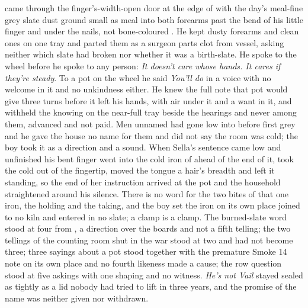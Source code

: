  came through the finger's-width-open door at the edge of  with the day's meal-fine grey slate dust ground small as meal into both forearms past the bend of his little finger and under the nails, not bone-coloured . He kept dusty forearms and clean ones on one tray and parted them as a surgeon parts clot from vessel, asking neither which slate had broken nor whether it was a birth-slate. He spoke to the wheel before he spoke to any person: \emph{It doesn't care whose hands. It cares if they're steady}. To a pot on the wheel he said \emph{You'll do} in a voice with no welcome in it and no unkindness either. He knew the full note that pot would give three turns before it left his hands, with air under it and a want in it, and withheld the knowing on the near-full tray beside the hearings and never among them, advanced and not paid. Men unnamed had gone low into  before first grey and he gave the house no name for them and did not say the room was cold; the boy took it as a direction and a sound. When Sella's sentence came low and unfinished his bent finger went into the cold iron of  ahead of the end of it, took the cold out of the fingertip, moved the tongue a hair's breadth and left it standing, so the end of her instruction arrived at the pot and the household straightened around his silence. There is no  word for the two bites of that one iron, the holding and the taking, and the boy set the iron on its own place joined to no kiln and entered in no slate; a clamp is a clamp. The burned-slate word stood at four from , a direction over the boards and not a fifth telling; the two tellings of the counting room shut in the war stood at two and had not become three; three sayings about a pot stood together with the premature Smoke 14 note on its own place and no fourth likeness made a cause; the row question stood at five askings with one shaping and no witness. \emph{He's not Vail} stayed sealed as tightly as a lid nobody had tried to lift in three years, and the promise of the name was neither given nor withdrawn.

